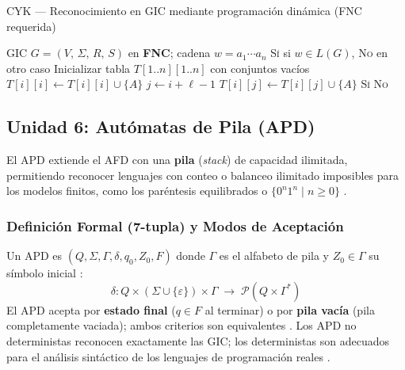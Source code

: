 \begin{algobox}{CYK — Reconocimiento en GIC mediante programación dinámica (FNC requerida)}
\begin{algorithmic}[1]
  \Require GIC $G = (V,\,\Sigma,\,R,\,S)$ en \textbf{FNC};\; cadena $w = a_1 \cdots a_n$
  \Ensure  \textsc{Sí} si $w \in L(G)$, \textsc{No} en otro caso
  \State {}
  \State Inicializar tabla $T[1..n][1..n]$ con conjuntos vacíos
   
      \State $T[i][i] \gets T[i][i] \cup \{A\}$
    \EndFor
  \EndFor
   
      \State $j \gets i + \ell - 1$
       
            \State $T[i][j] \gets T[i][j] \cup \{A\}$
          \EndIf
        \EndFor
      \EndFor
    \EndFor
  \EndFor
  \State
    \State \Return \textsc{Sí} 
  \Else
    \State \Return \textsc{No}
  \EndIf
  \State {}
\end{algorithmic}
\end{algobox}

\subsection*{Unidad 6: Autómatas de Pila (APD)}

El APD extiende el AFD con una \textbf{pila} (\emph{stack}) de capacidad ilimitada, permitiendo
reconocer lenguajes con conteo o balanceo ilimitado imposibles para los modelos finitos, como los
paréntesis equilibrados o $\{0^n1^n \mid n \geq 0\}$ \cite{sipser2012}.

\subsubsection*{Definición Formal (7-tupla) y Modos de Aceptación}

Un APD es $(Q,\Sigma,\Gamma,\delta,q_0,Z_0,F)$ donde $\Gamma$ es el alfabeto de pila y
$Z_0 \in \Gamma$ su símbolo inicial \cite{hopcroft2007es}:
\[
  \delta: Q \times (\Sigma \cup \{\varepsilon\}) \times \Gamma \;\longrightarrow\;
  \mathcal{P}\!\left(Q \times \Gamma^*\right)
\]
El APD acepta por \textbf{estado final} ($q \in F$ al terminar) o por \textbf{pila vacía}
(pila completamente vaciada); ambos criterios son equivalentes \cite{hopcroft2007es}. Los APD no
deterministas reconocen exactamente las GIC; los deterministas son adecuados para el análisis
sintáctico de los lenguajes de programación reales \cite{eugene2008}.

